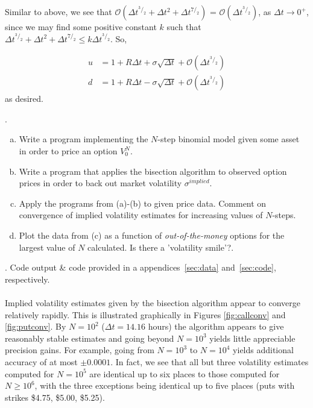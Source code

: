 \documentclass[12pt]{article}
\begin{document}
\noindent Similar to above, we see that $\mathcal O(\Delta t^{^3/_2} + \Delta t^2 + \Delta t^{7/_2})$ = $\mathcal O(\Delta t^{^3/_2})$, as $\Delta t \longrightarrow 0^+$, since we may find some positive constant $k$ such that $\Delta t^{^3/_2} + \Delta t^2 + \Delta t^{7/_2} \leq k\Delta t^{^3/_2}$. So,

\begin{align*}
u & = 1 + R\Delta t + \sigma\sqrt{\Delta t} + \mathcal O(\Delta t^{^3/_2}) \\
d & = 1 + R\Delta t - \sigma\sqrt{\Delta t} + \mathcal O(\Delta t^{^3/_2})
\end{align*}
as desired.

\newpage
{}.
\begin{enumerate}[(a)]
\item Write a program implementing the $N$-step binomial model given some asset in order to price an option $V^N_0$.
\item  Write a program that applies the bisection algorithm to observed option prices in order to back out market volatility $\sigma^{implied}$.
\item Apply the programs from (a)-(b) to given price data. Comment on convergence of implied volatility estimates for increasing values of $N$-steps.
\item Plot the data from (c) as a function of {\em out-of-the-money} options for the largest value of $N$ calculated. Is there a 'volatility smile'?.
\end{enumerate}
. Code output \& code provided in a appendices~\ref{sec:data} and~\ref{sec:code}, respectively.
\\
\\
\indent Implied volatility estimates given by the bisection algorithm appear to converge relatively rapidly. This is illustrated graphically in Figures \ref{fig:callconv} and \ref{fig:putconv}. By $N = 10^2$ ($\Delta t = 14.16$ hours) the algorithm appears to give reasonably stable estimates and going beyond $N = 10^3$ yields little appreciable precision gains. For example, going from $N = 10^3$ to $N = 10^4$ yields additional accuracy of at most $\pm 0.0001$. In fact, we see that all but three volatility estimates computed for $N = 10^5$ are identical up to six places to those computed for $N \geq 10^6$, with the three exceptions being identical up to five places (puts with strikes \$4.75, \$5.00, \$5.25).
\end{document}
